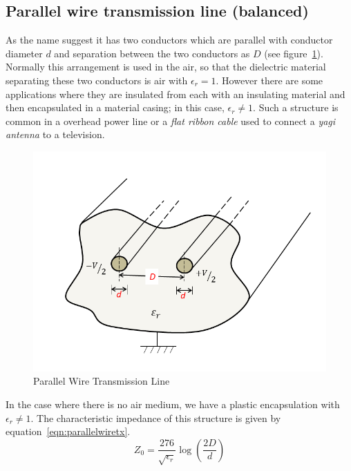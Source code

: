 \subsection{Parallel wire transmission line (balanced)} 
As the name suggest it has two conductors which are parallel with conductor diameter $d$ and separation between the two conductors as $D$ (see figure~\ref{fig:parallelwiretx}). Normally this arrangement is used in the air, so that the dielectric material separating these two conductors is air with $\epsilon_r=1$. However there are some applications where they are insulated from each with an insulating material and then encapsulated in a material casing; in this case, $\epsilon_r\neq1$. Such a structure is common in a overhead power line or a \emph{flat ribbon cable} used to connect a \emph{yagi antenna} to a television.
\begin{figure}[h]
\centering
\includegraphics[width=1\linewidth]{graphics/parallelWireTX}
\caption{Parallel Wire Transmission Line}
\label{fig:parallelwiretx}
\end{figure}

In the case where there is no air medium, we have a plastic encapsulation with $\epsilon_r\neq1$. The characteristic impedance of this structure is given by equation~\ref{eqn:parallelwiretx}.
\begin{equation}
Z_0 =\dfrac{276}{\sqrt{\epsilon_r}}\log(\dfrac{2D}{d})
\label{eqn:parallelwiretx}
\end{equation}

